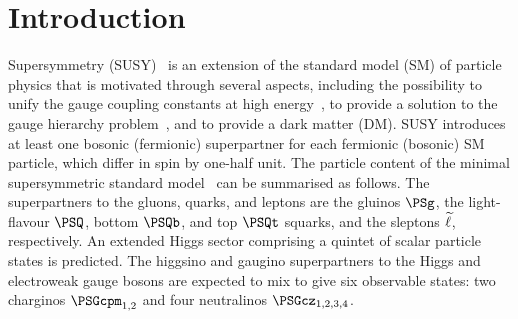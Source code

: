 
\maketitle


\section{Introduction}
\label{sec:introduction}

Supersymmetry (SUSY)~\cite{ref:SUSY-1, ref:SUSY0, ref:SUSY3,
  ref:SUSY1} is an extension of the standard model (SM) of particle
physics that is motivated through several aspects, including the
possibility to unify the gauge coupling constants at high
energy~\cite{Dimopoulos:1981yj, Ibanez:1981yh, Marciano:1981un}, to
provide a solution to the gauge hierarchy
problem~\cite{ref:hierarchy1, ref:hierarchy2}, and to provide a dark
matter (DM). SUSY introduces at least one bosonic (fermionic)
superpartner for each fermionic (bosonic) SM particle, which differ in
spin by one-half unit. The particle content of the minimal
supersymmetric standard model~\cite{ref:SUSY2} can be summarised as
follows. The superpartners to the gluons, quarks, and leptons are the
gluinos $\PSg$, the light-flavour $\PSQ$, bottom $\PSQb$, and top
$\PSQt$ squarks, and the sleptons $\widetilde{\ell}$, respectively. An extended
Higgs sector comprising a quintet of scalar particle states is
predicted. The higgsino and gaugino superpartners to the Higgs and
electroweak gauge bosons are expected to mix to give six observable
states: two charginos $\PSGcpm_{1,2}$ and four neutralinos
$\PSGcz_{1,2,3,4}$. 

